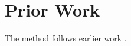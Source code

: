 \documentclass{article}
\begin{document}
\section{Prior Work}
The method follows earlier work \citep{smith2020}.


\end{document}
